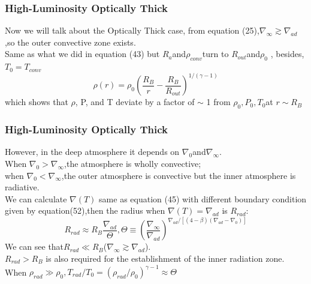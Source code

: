 \documentclass{beamer}
\begin{document}
\begin{frame}
\frametitle{High-Luminosity Optically Thick}
Now we will talk about the Optically Thick case, from equation (25),$\nabla_{\infty} \gtrsim \nabla_{ad}$,so the outer convective zone exists.\\
Same as what we did in equation (43) but $R_a$and$\rho_{conv}$turn to $R_{out}$and$\rho_0$ , besides, $T_0=T_{conv}$
\begin{equation}
\rho(r)=\rho_0{(\frac{R_B}{r}-\frac{R_B}{R_{out}})}^{1/(\gamma-1)}
\end{equation}
which shows that $\rho$, P, and T deviate by a factor of $\sim$ 1 from $\rho_0, P_0, T_0 $at $ r \sim R_B$
\end{frame}

\begin{frame}
\frametitle{High-Luminosity Optically Thick}
However, in the deep atmosphere it depends on $\nabla_0$and$\nabla_{\infty}$.\\
When $\nabla_0 > \nabla_{\infty}$,the atmosphere is wholly convective;\\
when $\nabla_0 < \nabla_{\infty}$,the outer atmosphere is convective but the inner atmosphere is radiative.\\
We can calculate $\nabla(T)$ same as equation (45) with different boundary condition given by equation(52),then the radius when $\nabla(T)=\nabla_{ad}$ is $R_{rad}$:
\begin{equation}
R_{rad} \approx R_B \frac{\nabla_{ad}}{\Theta},\Theta \equiv {(\frac{\nabla_{\infty}}{\nabla_{ad}})}^{\nabla_{ad}/[(4-\beta)(\nabla_{ad}-\nabla_0)]}
\end{equation}
We can see that$R_{rad} \ll R_B$($\nabla_{\infty} \gtrsim \nabla_{ad}$).\\
$R_{rad}>R_B$ is also required for the establishment of the inner radiation zone.\\
When $\rho_{rad} \gg \rho_0 ,T_{rad}/T_0={(\rho_{rad}/\rho_0)}^{\gamma-1} \approx \Theta $ 
\end{frame}
\end{document}
